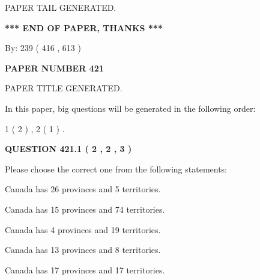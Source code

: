 \documentclass[12pt]{article}
\begin{document}
   
   
\vspace{2.0in} PAPER TAIL GENERATED.
   
   
   
   
\vspace{1.0in} 
{\textbf{\large{ *** END OF PAPER, THANKS *** }}} 
   
   
\hspace{1.0in} By: 
 239 ( 416 ,  613 )
   
   
   
   
\newpage 
\setcounter{page}{ 
   421001 } 
   
   
   
   
 {\textbf{ \Large{ PAPER NUMBER  421  }}}
   
   
\vspace{0.2in}
   
   
   
   
   
   
   
   
 \vspace{0.2in}
 
 
 
 
   
   
 PAPER TITLE GENERATED.
   
   
   
\vspace{0.2in}
   
In this paper, big questions will be generated in the following order: 
   
   
   1 ( 2 )
 ,
   2 ( 1 )
 .
  
\vspace{0.2in}
  
{\textbf{\Large{QUESTION
421.1 
 ( 2 , 2 , 3 )
}}}
  
  
Please choose the correct one from the following statements:
 
 
Canada has  26 provinces and  5 territories.
 
 
Canada has  15 provinces and  74 territories.
 
 
Canada has   4 provinces and  19 territories.
 
 
Canada has  13 provinces and  8 territories.
 
 
Canada has  17 provinces and  17 territories.
 
\end{document}
